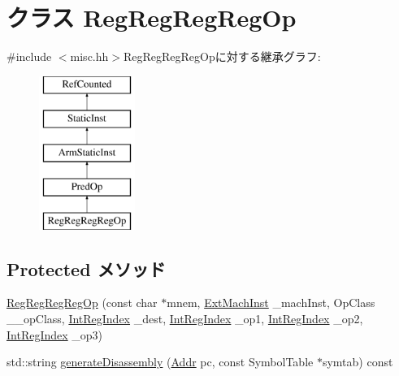 \hypertarget{classRegRegRegRegOp}{
\section{クラス RegRegRegRegOp}
\label{classRegRegRegRegOp}
}


{\ttfamily \#include $<$misc.hh$>$}RegRegRegRegOpに対する継承グラフ:\begin{figure}[H]
\begin{center}
\leavevmode
\includegraphics[height=5cm]{classRegRegRegRegOp}
\end{center}
\end{figure}
\subsection*{Protected メソッド}
\begin{DoxyCompactItemize}
\item 
\hyperlink{classRegRegRegRegOp_a8b9171f2421443ef19fc5d5f44914ff3}{RegRegRegRegOp} (const char $\ast$mnem, \hyperlink{classStaticInst_a5605d4fc727eae9e595325c90c0ec108}{ExtMachInst} \_\-machInst, OpClass \_\-\_\-opClass, \hyperlink{namespaceArmISA_ae64680ba9fb526106829d6bf92fc791b}{IntRegIndex} \_\-dest, \hyperlink{namespaceArmISA_ae64680ba9fb526106829d6bf92fc791b}{IntRegIndex} \_\-op1, \hyperlink{namespaceArmISA_ae64680ba9fb526106829d6bf92fc791b}{IntRegIndex} \_\-op2, \hyperlink{namespaceArmISA_ae64680ba9fb526106829d6bf92fc791b}{IntRegIndex} \_\-op3)
\item 
std::string \hyperlink{classRegRegRegRegOp_a95d323a22a5f07e14d6b4c9385a91896}{generateDisassembly} (\hyperlink{classm5_1_1params_1_1Addr}{Addr} pc, const SymbolTable $\ast$symtab) const 
\end{DoxyCompactItemize}
